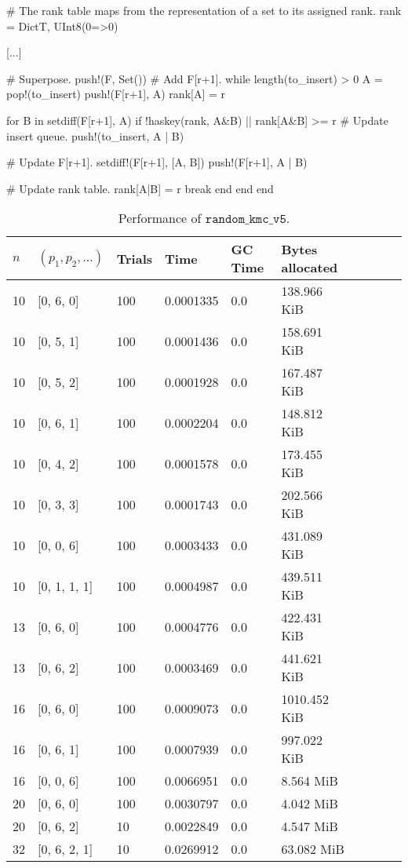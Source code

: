 \begin{jllisting}
  # The rank table maps from the representation of a set to its assigned rank.
  rank = Dict{T, UInt8}(0=>0)
  
  [...]
  
  # Superpose.
  push!(F, Set()) # Add F[r+1].
  while length(to_insert) > 0
    A = pop!(to_insert)
    push!(F[r+1], A)
    rank[A] = r
  
    
    for B in setdiff(F[r+1], A)
      if !haskey(rank, A&B) || rank[A&B] >= r
        # Update insert queue.
        push!(to_insert, A | B)
    
        # Update F[r+1].
        setdiff!(F[r+1], [A, B])
        push!(F[r+1], A | B)
    
        # Update rank table.
        rank[A|B] = r
        break
      end
    end
  end
\end{jllisting}
\begin{table}[ht!]
  \centering
  \caption{Performance of $\texttt{random\_kmc\_v5}$.}
  \label{tab:perf_v5}
    \begin{tabular}{llllllllll}
      \toprule
      $n$ & $(p_1, p_2, \ldots)$ & Trials & Time  & GC Time & Bytes allocated \\
      \midrule
      10 & [0, 6, 0] & 100 & 0.0001335 & 0.0 & 138.966 KiB \\
      10 & [0, 5, 1] & 100 & 0.0001436 & 0.0 & 158.691 KiB \\
      10 & [0, 5, 2] & 100 & 0.0001928 & 0.0 & 167.487 KiB \\
      10 & [0, 6, 1] & 100 & 0.0002204 & 0.0 & 148.812 KiB \\
      10 & [0, 4, 2] & 100 & 0.0001578 & 0.0 & 173.455 KiB \\
      10 & [0, 3, 3] & 100 & 0.0001743 & 0.0 & 202.566 KiB \\
      10 & [0, 0, 6] & 100 & 0.0003433 & 0.0 & 431.089 KiB \\
      10 & [0, 1, 1, 1] & 100 & 0.0004987 & 0.0 & 439.511 KiB \\
      13 & [0, 6, 0] & 100 & 0.0004776 & 0.0 & 422.431 KiB \\
      13 & [0, 6, 2] & 100 & 0.0003469 & 0.0 & 441.621 KiB \\
      16 & [0, 6, 0] & 100 & 0.0009073 & 0.0 & 1010.452 KiB \\
      16 & [0, 6, 1] & 100 & 0.0007939 & 0.0 & 997.022 KiB \\
      16 & [0, 0, 6] & 100 & 0.0066951 & 0.0 & 8.564 MiB \\
      20 & [0, 6, 0] & 100 & 0.0030797 & 0.0 & 4.042 MiB  \\
      20 & [0, 6, 2] & 10 & 0.0022849 & 0.0 & 4.547 MiB  \\
      32 & [0, 6, 2, 1] & 10 & 0.0269912 & 0.0 & 63.082 MiB  \\
      \bottomrule
    \end{tabular}
\end{table}
